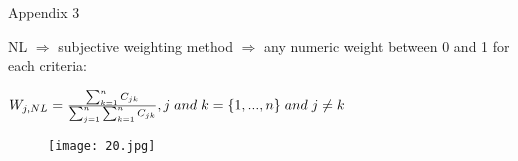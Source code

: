 \documentclass{beamer}
\begin{document}
	\begin{frame}{Appendix 3}
				\hypertarget{3}{}
				\begin{block}{	NL 	$ \Longrightarrow $	subjective weighting method 	$ \Longrightarrow $ any numeric weight between 0 and 1 for each criteria:}
\begin{center}
	$	W_{j,NL}=\frac{\sum_{k=1}^{n}C_{jk} }{\sum_{j=1}^{n}\sum_{k=1}^{n}C_{jk}}, j \hspace{0.1cm} and \hspace{0.1cm} k=\{1,...,n\}\hspace{0.1cm} and \hspace{0.1cm}j\neq k$
\end{center}
				\end{block}


	
	\begin{figure}
		\centering
		\texttt{[image: 20.jpg]}
		\caption{}
		\label{fig:20}
	\end{figure}
	\end{frame}
	
	
	
\end{document}
